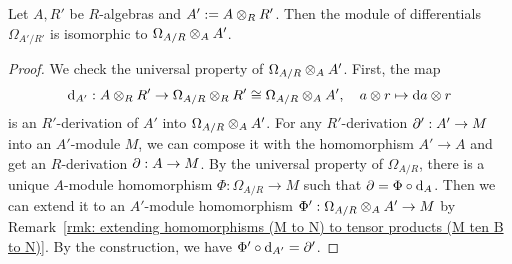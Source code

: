     \begin{proposition}\label{prop: module of differentials is stable under base change}
        Let \(A, R'\) be \(R\)-algebras and \(A':= A\ten_R R'\).
        Then the module of differentials \(\Omega_{A'/R'}\) is isomorphic to \(\Omega_{A/R} \ten_A A'\).
    \end{proposition}
    \begin{proof}
        We check the universal property of \(\Omega_{A/R} \ten_A A'\).
        First, the map 
        \[ \d_{A'}: A \ten_R R' \to \Omega_{A/R} \ten_R R' \cong \Omega_{A/R} \ten_A A',\quad a\ten r \mapsto \d a \ten r\]
        is an \(R'\)-derivation of \(A'\) into \(\Omega_{A/R} \ten_A A'\).
        For any \(R'\)-derivation \(\P': A' \to M\) into an \(A'\)-module \(M\), 
        we can compose it with the homomorphism \(A' \to A\) and get an \(R\)-derivation \(\P: A \to M\).
        By the universal property of \(\Omega_{A/R}\), 
        there is a unique \(A\)-module homomorphism \(\Phi: \Omega_{A/R} \to M\) such that \(\P = \Phi \circ \d_A\).
        Then we can extend it to an \(A'\)-module homomorphism \(\Phi': \Omega_{A/R} \ten_A A' \to M\) by Remark~\ref{rmk: extending homomorphisms (M to N) to tensor products (M ten B to N)}.
        By the construction, we have \(\Phi' \circ \d_{A'} = \P'\).
    \end{proof}

